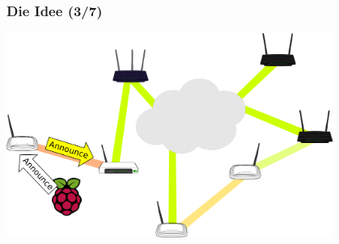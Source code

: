 \documentclass[accentcolor=tud6b,colorbacktitle,inverttitle,landscape,german,presentation,t]{tudbeamer}
\begin{document}
	\begin{frame}
		\frametitle{Die Idee (3/7)}
		\begin{center}
			\vspace{0cm}
			\includegraphics[width=0.8\textwidth]{images/service-discovery3}
			\vspace{0.4cm}
		\end{center}
		
	\end{frame}
	
\end{document}
